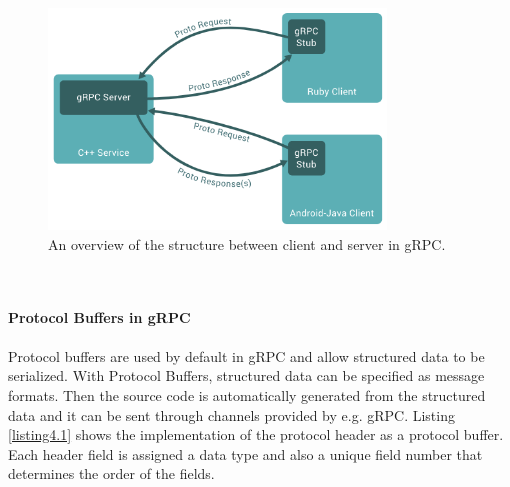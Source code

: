 \begin{figure}[tbp]
  \centering
  \includegraphics[width=0.8\textwidth]{images/grpc.png}
  \caption[gRPC Framework Structure]{An overview of the structure between client and server in gRPC.}
  \label{fig:Appliance_Model}
\end{figure}\\
\\
\textbf{Protocol Buffers in gRPC}
\\
\\
Protocol buffers are used by default in gRPC and allow structured data to be serialized. With Protocol Buffers, structured data can be specified as message formats. Then the source code is automatically generated from the structured data and it can be sent through channels provided by e.g. gRPC.
Listing \ref{listing4.1} shows the implementation of the protocol header as a protocol buffer. Each header field is assigned a data type and also a unique field number that determines the order of the fields.\\

